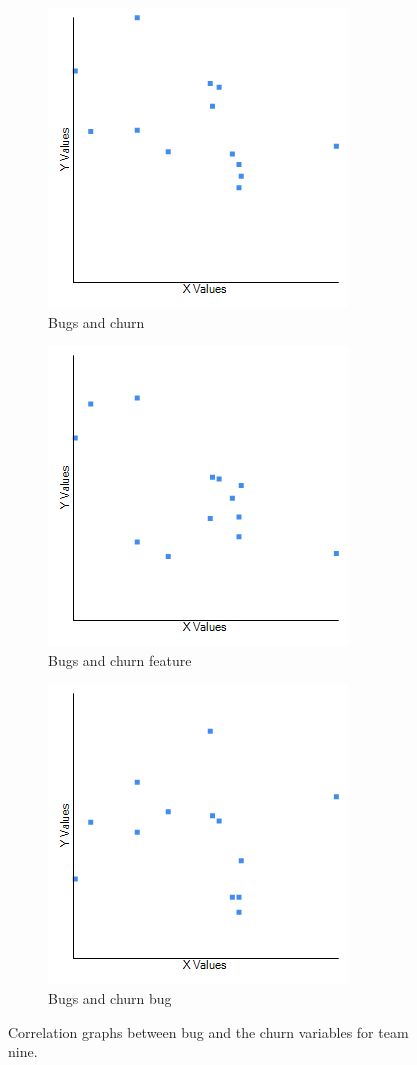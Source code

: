 \documentclass[UKenglish]{ifimaster}  %
\begin{document}
\begin{figure}[h] 
  \begin{subfigure}[b]{0.3\textwidth}
\includegraphics[scale=0.5]{Picture/Nine/BugsVSChrn.png}
 \caption{Bugs and churn} 
 \label{fig:a:9}
  \end{subfigure}
  \begin{subfigure}[b]{0.3\textwidth}
\includegraphics[scale=0.5]{Picture/Nine/BugsVSChrnFT.png}
 \caption{Bugs and churn feature} 
\label{fig:b:9}
  \end{subfigure}
  \begin{subfigure}[b]{0.3\textwidth}
\includegraphics[scale=0.5]{Picture/Nine/BugsVSChrnB.png}
 \caption{Bugs and churn bug} 
\label{fig:c:9}
  \end{subfigure}
\caption{Correlation graphs between bug and the churn variables for team nine.}
\label{corr:Difference:9}
\end{figure}
\newpage
\end{document}
